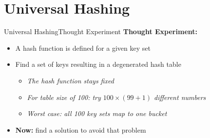 \section{Universal Hashing}

\def\E{\mathbb{E}}

\begin{frame}{Universal Hashing}{Thought Experiment}
  \textbf{Thought Experiment:}\\
  \begin{itemize}
    \item<1->
      A {\color{MainA}hash function} is defined for a given
      {\color{MainA}key set}
    \item<2->
      Find a {\color{MainA}set of keys} resulting in a degenerated
      {\color{MainA}hash table}
      \begin{itemize}
        \item<3->\textit{The {\color{MainA}hash function} stays fixed}\\
        \item<4->\textit{For table size of 100: try $100 \times (99 + 1)$ different numbers}\\
       \item<5->\textit{Worst case: all 100 {\color{MainA}key sets} map to
         one bucket}
      \end{itemize}
    \item<5->
      \textbf{Now:} find a solution to avoid that problem
  \end{itemize}
\end{frame}


